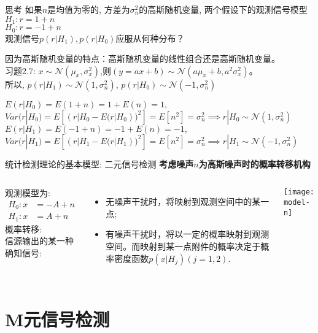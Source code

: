 \begin{frame}[shrink]
\begin{block}{思考}
	如果$n$是均值为零的, 方差为$\sigma_n^2$的高斯随机变量, 两个假设下的观测信号模型\\
	$H_1: r=1+n$\\
	$H_0: r=-1+n$\\
	观测信号$p(r|H_1),p(r|H_0)$应服从何种分布？
\end{block}
\begin{block}{}
	因为高斯随机变量的特点：高斯随机变量的线性组合还是高斯随机变量。\\
	习题2.7: $x\sim\mathcal{N}(\mu_x,\sigma_x^2)$,则$(y=ax+b)\sim\mathcal{N}(a\mu_x+b,a^2\sigma_x^2)$。\\
	所以, $p(r|H_1)\sim\mathcal{N}(1,\sigma_n^2)$, $p(r|H_0)\sim\mathcal{N}(-1,\sigma_n^2)$
\end{block}
\begin{block}{}
	$E(r|H_0)=E(1+n)=1+E(n)=1,$\\
	$Var(r|H_0)=E[(r|H_0-E(r|H_0))^2]=E[n^2]=\sigma_n^2\implies r|H_0\sim\mathcal{N}(1,\sigma_n^2)$\\
	$E(r|H_1)=E(-1+n)=-1+E(n)=-1,$\\
	$Var(r|H_1)=E[(r|H_1-E(r|H_1))^2]=E[n^2]=\sigma_n^2\implies r|H_1\sim\mathcal{N}(-1,\sigma_n^2)$
\end{block}
\end{frame}


\begin{frame}{统计检测理论的基本模型: 二元信号检测}
\textbf{考虑噪声$n$为高斯噪声时的概率转移机构}
\begin{columns}
	观测模型为:
	\begin{align*}
	H_0: x&=-A+n\\
	H_1: x&=A+n
	\end{align*}
	概率转移:\\
	信源输出的某一种确知信号:
	\begin{itemize}
		\item 无噪声干扰时，将映射到观测空间中的某一点;
		\item 有噪声干扰时，将以一定的概率映射到观测空间。而映射到某一点附件的概率决定于概率密度函数$p(x|H_j)(j=1,2)$.
	\end{itemize}
	\texttt{[image: model-n]}
\end{columns}
\end{frame}

\section{M元信号检测}

